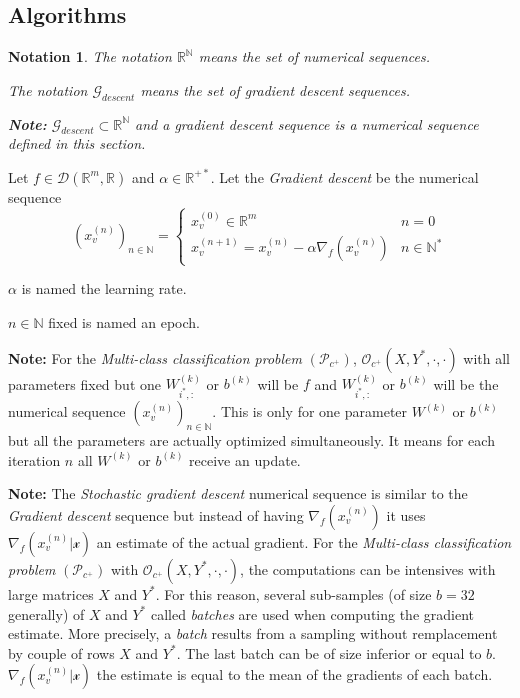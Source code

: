 \documentclass[11pt,en]{elegantpaper}
\newtheorem{notation}{Notation}
\newcommand{\Real}{\mathbb{R}}
\begin{document}
\subsection{Algorithms}

\begin{notation}
  The notation $\Real^{\mathbb{N}}$ means the set of numerical sequences. \par
  The notation $\mathcal{G}_{descent}$ means the set of gradient descent sequences. \par
  \textbf{Note:} $\mathcal{G}_{descent} \subset \Real^{\mathbb{N}}$ and a gradient descent sequence is a
  numerical sequence defined in this section.
\end{notation}

\begin{definition}
  Let $f \in \mathcal{D}(\Real^m,\Real)$ and $\alpha \in \Real^{+*}$. Let the \textit{Gradient descent}
  be the numerical sequence \begin{equation}\label{def:vanilla_grad_descent}
    (x_v^{(n)})_{n \in \mathbb{N}} = \left\{
      \begin{array}{ll}
        x_v^{(0)} \in \Real^m & n = 0 \\
        x_v^{(n+1)} = x_v^{(n)} - \alpha \nabla_f(x_v^{(n)}) & n \in \mathbb{N}^*
      \end{array}
    \right.
  \end{equation} \par

  $\alpha$ is named the learning rate. \par
  $n \in \mathbb{N}$ fixed is named an epoch.

  \textbf{Note:} For the \textit{Multi-class classification problem} $(\mathcal{P}_{c^+})$,
  $\mathcal{O}_{c^+}(X,Y^*,\cdot,\cdot)$ with all parameters fixed but one $W^{(k)}_{i^*,:}$ or $b^{(k)}$ will be $f$
  and $W^{(k)}_{i^*,:}$ or $b^{(k)}$ will be the numerical sequence $(x_v^{(n)})_{n \in \mathbb{N}}$.
  This is only for one parameter $W^{(k)}$ or $b^{(k)}$ but all the parameters are actually optimized simultaneously.
  It means for each iteration $n$ all $W^{(k)}$ or $b^{(k)}$ receive an update.

  \textbf{Note:} The \textit{Stochastic gradient descent} numerical sequence is similar to the \textit{Gradient descent} sequence but instead of
  having $\nabla_f(x_v^{(n)})$ it uses $\nabla_f(x_v^{(n)} | \mathcal{x})$ an estimate of the actual gradient.
  For the \textit{Multi-class classification problem} $(\mathcal{P}_{c^+})$ with $\mathcal{O}_{c^+}(X,Y^*,\cdot,\cdot)$, the computations
  can be intensives with large matrices $X$ and $Y^*$. For this reason, several sub-samples (of size $b=32$ generally) of $X$ and $Y^*$ called
  \textit{batches} are used when computing the gradient estimate. More precisely, a \textit{batch} results from a sampling without remplacement
  by couple of rows $X$ and $Y^*$. The last batch can be of size inferior or equal to $b$. $\nabla_f(x_v^{(n)} | \mathcal{x})$
  the estimate is equal to the mean of the gradients of each batch.
\end{definition}
\end{document}
